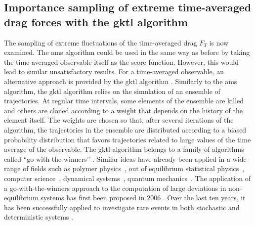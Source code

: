 \documentclass[pre,aps,floatfix,10pt,superscriptaddress, notitlepage,preprint]{revtex4-1}
\begin{document}
\subsection{Importance sampling of extreme time-averaged drag forces with the \acl{gktl} algorithm}
\label{sec:gktl}
The sampling of extreme fluctuations of the time-averaged drag $F_T$ is now examined.
The \ac{ams} algorithm could be used in the same way as before
by taking the time-averaged observable itself as the score function.
However, this would lead to similar unsatisfactory results.
%
For a time-averaged observable, an alternative approach is provided by the \acf{gktl} algorithm \cite{giardina_direct_2006,tailleur_probing_2007,giardina_simulating_2011}.
%
Similarly to the \ac{ams} algorithm, the \ac{gktl} algorithm relies on the simulation of an ensemble of trajectories.
%
At regular time intervals, some elements of the ensemble are killed and others are cloned according to a weight that depends on the history of the element itself.
%
The weights are chosen so that, after several iterations of the algorithm, the trajectories in the ensemble are distributed according to a biased probability distribution that favors trajectories related to large values of the time average of the observable.
%
The \ac{gktl} algorithm belongs to a family of algorithms called ``go with the winners'' \cite{aldous1994go,grassberger2002go}.
{Similar ideas have already been applied in a wide range of fields such as polymer physics~\cite{grassberger1998perm}, out of equilibrium statistical physics~\cite{PhysRevLett.118.115702}, computer science~\cite{aldous1994go}, dynamical systems~\cite{tailleur_probing_2007}, quantum mechanics~\cite{intro_DMC_kosztin}.}
The application of a go-with-the-winners approach to the computation of large deviations in non-equilibrium systems has first been proposed in 2006 \cite{giardina_direct_2006}.
Over the last ten years, it has been successfully applied to investigate rare events in both stochastic \cite{giardina_direct_2006,lecomte_numerical_2007,garrahan2007dynamical} and deterministic systems \cite{giardina_direct_2006,tailleur_probing_2007}.
\end{document}

